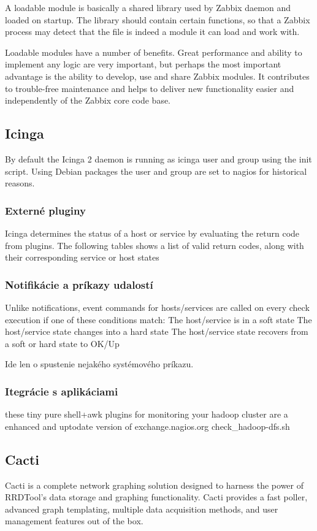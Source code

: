 \documentclass[11pt,final,oneside]{fithesis}
\begin{document}
A loadable module is basically a shared library used by Zabbix daemon and loaded on startup. The library should contain certain functions, so that a Zabbix process may detect that the file is indeed a module it can load and work with.

Loadable modules have a number of benefits. Great performance and ability to implement any logic are very important, but perhaps the most important advantage is the ability to develop, use and share Zabbix modules. It contributes to trouble-free maintenance and helps to deliver new functionality easier and independently of the Zabbix core code base.
\cite{06}

\subsection{Icinga}
By default the Icinga 2 daemon is running as icinga user and group using the init script. Using Debian packages the user and group are set to nagios for historical reasons.
\cite{07}

\subsubsection{Externé pluginy}
Icinga determines the status of a host or service by evaluating the return code from plugins. The following tables shows a list of valid return codes, along with their corresponding service or host states
\cite{08}

\subsubsection{Notifikácie a príkazy udalostí}
Unlike notifications, event commands for hosts/services are called on every check execution if one of these conditions match:
The host/service is in a soft state
The host/service state changes into a hard state
The host/service state recovers from a soft or hard state to OK/Up

Ide len o spustenie nejakého systémového príkazu.
\cite{09}

\subsubsection{Itegrácie s aplikáciami} 
these tiny pure shell+awk plugins for monitoring your hadoop cluster are a enhanced and uptodate version of exchange.nagios.org check_hadoop-dfs.sh
\cite{10}

\subsection{Cacti}
Cacti is a complete network graphing solution designed to harness the power of RRDTool's data storage and graphing functionality. Cacti provides a fast poller, advanced graph templating, multiple data acquisition methods, and user management features out of the box.
\cite{11}
\end{document}
